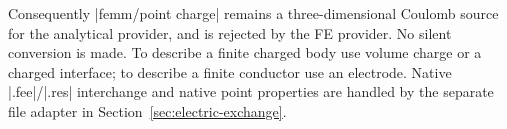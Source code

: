 Consequently |femm/point charge| remains a three-dimensional Coulomb source
for the analytical provider, and is rejected by the FE provider. No silent
conversion is made. To describe a finite charged body use volume charge or a
charged interface; to describe a finite conductor use an electrode. Native
|.fee|/|.res| interchange and native point properties are handled by the separate
file adapter in Section~\ref{sec:electric-exchange}.
